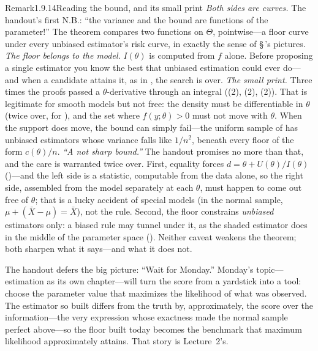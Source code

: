 \documentclass[main.tex]{subfiles}
\begin{document}
\begin{ObjL}{Remark}{1.9.14}{Reading the bound, and its small print}
\emph{Both sides are curves.} The handout's first N.B.: ``the variance and the bound are
functions of the parameter!'' The theorem compares two functions on $\Theta$, pointwise---a
floor curve under every unbiased estimator's risk curve, in exactly the sense of
\S\,'s pictures.
\emph{The floor belongs to the model.} $I(\theta)$ is computed from $f$ alone. Before
proposing a single estimator you know the best that unbiased estimation could ever do---and
when a candidate attains it, as in , the search is over.
\emph{The small print.} Three times the proofs passed a $\theta$-derivative through an
integral ((2), (2), (2)). That is legitimate for smooth
models but not free: the density must be differentiable in $\theta$ (twice over, for
), and the set where $f(y;\theta)>0$ must not move with $\theta$. When the support does move, the bound can simply fail---the uniform
sample of  has unbiased estimators whose variance falls like $1/n^2$, beneath
every floor of the form $c(\theta)/n$.
\emph{``A not sharp bound.''} The handout promises no more than that, and the care is
warranted twice over. First, equality forces $d=\theta+U(\theta)/I(\theta)$
()---and the left side is a statistic, computable from the data alone, so the
right side, assembled from the model separately at each $\theta$, must happen to come out
free of $\theta$; that is a lucky accident of special models (in the normal sample,
$\mu+(\bar X-\mu)=\bar X$), not the rule. Second, the floor constrains \emph{unbiased} estimators only: a biased rule may
tunnel under it, as the shaded estimator does in the middle of the parameter space
(). Neither caveat weakens the theorem; both sharpen what it says---and what it
does not.
\end{ObjL}

\medskip
The handout defers the big picture: ``Wait for Monday.'' Monday's topic---estimation as its
own chapter---will turn the score from a yardstick into a tool: choose the parameter value
that maximizes the likelihood of what was observed. The estimator so built differs from the
truth by, approximately, the score over the information---the very expression whose exactness
made the normal sample perfect above---so the floor built today becomes the benchmark that
maximum likelihood approximately attains. That story is Lecture~2's.

\lectureappendix
\end{document}
